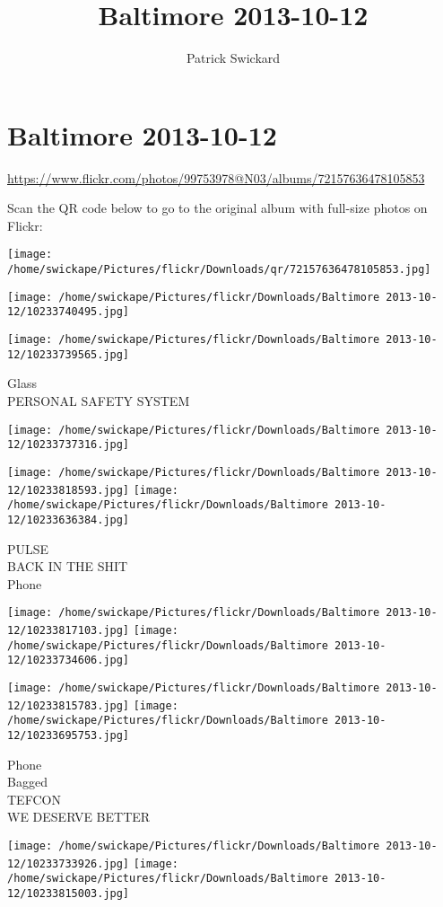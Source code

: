 \documentclass[10pt,letterpaper]{article}
\title{Baltimore 2013-10-12}
\author{Patrick Swickard}
\date{}
\begin{document}
\section*{Baltimore 2013-10-12}

\url{https://www.flickr.com/photos/99753978@N03/albums/72157636478105853}

Scan the QR code below to go to the original album with full-size photos on Flickr:

\texttt{[image: /home/swickape/Pictures/flickr/Downloads/qr/72157636478105853.jpg]}
\pagebreak

\texttt{[image: /home/swickape/Pictures/flickr/Downloads/Baltimore 2013-10-12/10233740495.jpg]}

\vspace{0.25in}
\texttt{[image: /home/swickape/Pictures/flickr/Downloads/Baltimore 2013-10-12/10233739565.jpg]}

Glass\\
PERSONAL SAFETY SYSTEM
\pagebreak

\texttt{[image: /home/swickape/Pictures/flickr/Downloads/Baltimore 2013-10-12/10233737316.jpg]}

\vspace{0.25in}
\texttt{[image: /home/swickape/Pictures/flickr/Downloads/Baltimore 2013-10-12/10233818593.jpg]}
\texttt{[image: /home/swickape/Pictures/flickr/Downloads/Baltimore 2013-10-12/10233636384.jpg]}

PULSE\\
BACK IN THE SHIT\\
Phone
\pagebreak

\texttt{[image: /home/swickape/Pictures/flickr/Downloads/Baltimore 2013-10-12/10233817103.jpg]}
\texttt{[image: /home/swickape/Pictures/flickr/Downloads/Baltimore 2013-10-12/10233734606.jpg]}

\texttt{[image: /home/swickape/Pictures/flickr/Downloads/Baltimore 2013-10-12/10233815783.jpg]}
\texttt{[image: /home/swickape/Pictures/flickr/Downloads/Baltimore 2013-10-12/10233695753.jpg]}

Phone\\
Bagged\\
TEFCON\\
WE DESERVE BETTER
\pagebreak

\texttt{[image: /home/swickape/Pictures/flickr/Downloads/Baltimore 2013-10-12/10233733926.jpg]}
\texttt{[image: /home/swickape/Pictures/flickr/Downloads/Baltimore 2013-10-12/10233815003.jpg]}
\end{document}
